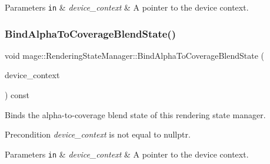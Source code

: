 \begin{DoxyParams}[1]{Parameters}
\mbox{\tt in}  & {\em device\+\_\+context} & A pointer to the device context. \\
\hline
\end{DoxyParams}
\hypertarget{classmage_1_1_rendering_state_manager_a358729c6b5f9aac89b95842bd095ec93}{}\label{classmage_1_1_rendering_state_manager_a358729c6b5f9aac89b95842bd095ec93} 
\subsubsection{\texorpdfstring{Bind\+Alpha\+To\+Coverage\+Blend\+State()}{BindAlphaToCoverageBlendState()}}
{\footnotesize\ttfamily void mage\+::\+Rendering\+State\+Manager\+::\+Bind\+Alpha\+To\+Coverage\+Blend\+State (\begin{DoxyParamCaption}\item[{I\+D3\+D11\+Device\+Context4 $\ast$}]{device\+\_\+context }\end{DoxyParamCaption}) const\hspace{0.3cm}{\ttfamily [noexcept]}}

Binds the alpha-\/to-\/coverage blend state of this rendering state manager.

\begin{DoxyPrecond}{Precondition}
{\itshape device\+\_\+context} is not equal to {\ttfamily nullptr}. 
\end{DoxyPrecond}

\begin{DoxyParams}[1]{Parameters}
\mbox{\tt in}  & {\em device\+\_\+context} & A pointer to the device context. \\
\hline
\end{DoxyParams}
\hypertarget{classmage_1_1_rendering_state_manager_a56b9dff8574613095a8a126aaff97803}{}\label{classmage_1_1_rendering_state_manager_a56b9dff8574613095a8a126aaff97803} 
